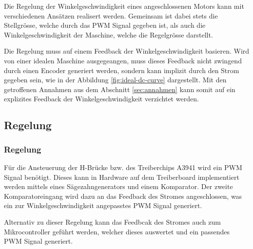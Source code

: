 Die Regelung der Winkelgeschwindigkeit eines angeschlossenen Motors kann
mit verschiedenen Ansätzen realisert werden. Gemeinsam ist dabei stets die
Stellgrösse, welche durch das PWM Signal gegeben ist, als auch die
Winkelgeschwindigkeit der Maschine, welche die Regelgrösse darstellt.

Die Regelung muss auf einem Feedback der Winkelgeschwindigkeit basieren.
Wird von einer idealen Maschine ausgegeangen, muss dieses Feedback nicht
zwingend durch einen Encoder generiert werden, sondern kann implizit durch
den Strom gegeben sein, wie in der Abbildung \ref{fig:ideal-dc-curve}
dargestellt. Mit den getroffenen Annahmen aus dem Abschnitt
\ref{sec:annahmen} kann somit auf ein explizites Feedback der
Winkelgeschwindigkeit verzichtet werden. 

\ifSTANDALONE
\subsection{Regelung}
\fi
\ifEMBED
\subsubsection{Regelung}
\fi
Für die Ansteuerung der H-Brücke bzw. des Treiberchips A3941 wird ein PWM
Signal benötigt. Dieses kann in Hardware auf dem Treiberboard implementiert
werden mittels eines Sägezahngenerators und einem Komparator. Der zweite
Komparatoreingang wird dazu an das Feedback des Stromes angeschlossen, was
ein zur Winkelgeschwindigkeit angepasstes PWM Signal generiert.

Alternativ zu dieser Regelung kann das Feedbcak des Stromes auch zum
Mikrocontroller geführt werden, welcher dieses auswertet und ein passendes
PWM Signal generiert.

